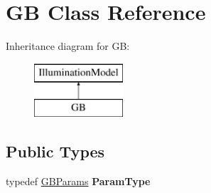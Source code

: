 \hypertarget{classGB}{\section{G\-B Class Reference}
\label{classGB}
}
Inheritance diagram for G\-B\-:\begin{figure}[H]
\begin{center}
\leavevmode
\includegraphics[height=2.000000cm]{classGB}
\end{center}
\end{figure}
\subsection*{Public Types}
\begin{DoxyCompactItemize}
\item 
\hypertarget{classGB_a0772c7b02b95046a221df78fb3b9b77f}{typedef \hyperlink{structGBParams}{G\-B\-Params} {\bfseries Param\-Type}}\label{classGB_a0772c7b02b95046a221df78fb3b9b77f}

\end{DoxyCompactItemize}
